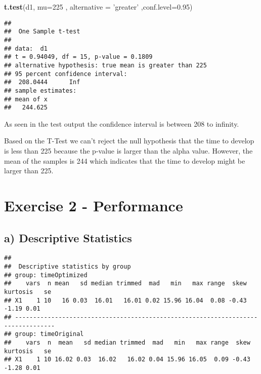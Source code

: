 \documentclass[
]{article}
\newenvironment{Shaded}{\begin{snugshade}}{\end{snugshade}}
\newcommand{\DataTypeTok}[1]{\textcolor[rgb]{0.13,0.29,0.53}{#1}}
\newcommand{\DecValTok}[1]{\textcolor[rgb]{0.00,0.00,0.81}{#1}}
\newcommand{\FloatTok}[1]{\textcolor[rgb]{0.00,0.00,0.81}{#1}}
\newcommand{\KeywordTok}[1]{\textcolor[rgb]{0.13,0.29,0.53}{\textbf{#1}}}
\newcommand{\NormalTok}[1]{#1}
\newcommand{\OperatorTok}[1]{\textcolor[rgb]{0.81,0.36,0.00}{\textbf{#1}}}
\newcommand{\StringTok}[1]{\textcolor[rgb]{0.31,0.60,0.02}{#1}}
\begin{document}
\begin{Shaded}
\begin{Highlighting}[]
\KeywordTok{t.test}\NormalTok{(d1, }\DataTypeTok{mu=}\DecValTok{225}\NormalTok{ , }\DataTypeTok{alternative =} \StringTok{'greater'}\NormalTok{ ,}\DataTypeTok{conf.level=}\FloatTok{0.95}\NormalTok{)}
\end{Highlighting}
\end{Shaded}

\begin{verbatim}
## 
##  One Sample t-test
## 
## data:  d1
## t = 0.94049, df = 15, p-value = 0.1809
## alternative hypothesis: true mean is greater than 225
## 95 percent confidence interval:
##  208.0444      Inf
## sample estimates:
## mean of x 
##   244.625
\end{verbatim}

As seen in the test output the confidence interval is between 208 to
infinity.

Based on the T-Test we can't reject the null hypothesis that the time to
develop is less than 225 because the p-value is larger than the alpha
value. However, the mean of the samples is 244 which indicates that the
time to develop might be larger than 225.

\hypertarget{exercise-2---performance}{%
\section{Exercise 2 - Performance}\label{exercise-2---performance}}

\hypertarget{a-descriptive-statistics}{%
\subsection{a) Descriptive Statistics}\label{a-descriptive-statistics}}

\begin{Shaded}
\end{Shaded}

\begin{verbatim}
## 
##  Descriptive statistics by group 
## group: timeOptimized
##    vars  n mean   sd median trimmed  mad   min   max range  skew kurtosis   se
## X1    1 10   16 0.03  16.01   16.01 0.02 15.96 16.04  0.08 -0.43    -1.19 0.01
## --------------------------------------------------------------------------------- 
## group: timeOriginal
##    vars  n  mean   sd median trimmed  mad   min   max range  skew kurtosis   se
## X1    1 10 16.02 0.03  16.02   16.02 0.04 15.96 16.05  0.09 -0.43    -1.28 0.01
\end{verbatim}
\end{document}
